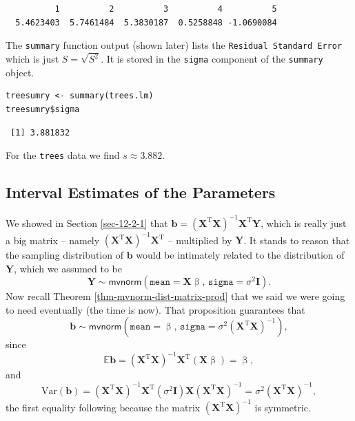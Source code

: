 \documentclass[captions=tableheading]{scrbook}
\begin{document}
\begin{verbatim}
          1          2          3          4          5 
  5.4623403  5.7461484  5.3830187  0.5258848 -1.0690084
\end{verbatim}

The \texttt{summary} function output (shown later) lists the \texttt{Residual Standard Error} which is just \(S=\sqrt{S^{2}}\). It is stored in the \texttt{sigma} component of the \texttt{summary} object.


\begin{verbatim}
treesumry <- summary(trees.lm)
treesumry$sigma
\end{verbatim}

\begin{verbatim}
 [1] 3.881832
\end{verbatim}

For the \texttt{trees} data we find \(s\approx  3.882 \).
\subsection{Interval Estimates of the Parameters}
\label{sec-12-2-4}
\label{sub-mlr-interval-est-params}


We showed in Section \ref{sec-12-2-1} that \(\mathbf{b}=\left(\mathbf{X}^{\mathrm{T}}\mathbf{X}\right)^{-1}\mathbf{X}^{\mathrm{T}}\mathbf{Y}\), which is really just a big matrix -- namely \(\left(\mathbf{X}^{\mathrm{T}}\mathbf{X}\right)^{-1}\mathbf{X}^{\mathrm{T}}\) -- multiplied by \(\mathbf{Y}\). It stands to reason that the sampling distribution of \(\mathbf{b}\) would be intimately related to the distribution of \(\mathbf{Y}\), which we assumed to be
\begin{equation}
\mathbf{Y}\sim\mathsf{mvnorm}\left(\mathtt{mean}=\mathbf{X}\upbeta,\,\mathtt{sigma}=\sigma^{2}\mathbf{I}\right).
\end{equation}
Now recall Theorem \ref{thm-mvnorm-dist-matrix-prod} that we said we were going to need eventually (the time is now). That proposition guarantees that
\begin{equation}
\mathbf{b}\sim\mathsf{mvnorm}\left(\mathtt{mean}=\upbeta,\,\mathtt{sigma}=\sigma^{2}\left(\mathbf{X}^{\mathrm{T}}\mathbf{X}\right)^{-1}\right),\label{eq-distn-b-mlr}
\end{equation}
since
\begin{equation}
\mathbb{E}\mathbf{b}=\left(\mathbf{X}^{\mathrm{T}}\mathbf{X}\right)^{-1}\mathbf{X}^{\mathrm{T}}(\mathbf{X}\upbeta)=\upbeta,
\end{equation}
and
\begin{equation}
\mbox{Var}(\mathbf{b})=\left(\mathbf{X}^{\mathrm{T}}\mathbf{X}\right)^{-1}\mathbf{X}^{\mathrm{T}}(\sigma^{2}\mathbf{I})\mathbf{X}\left(\mathbf{X}^{\mathrm{T}}\mathbf{X}\right)^{-1}=\sigma^{2}\left(\mathbf{X}^{\mathrm{T}}\mathbf{X}\right)^{-1},
\end{equation}
the first equality following because the matrix \(\left(\mathbf{X}^{\mathrm{T}}\mathbf{X}\right)^{-1}\) is symmetric.
\end{document}
